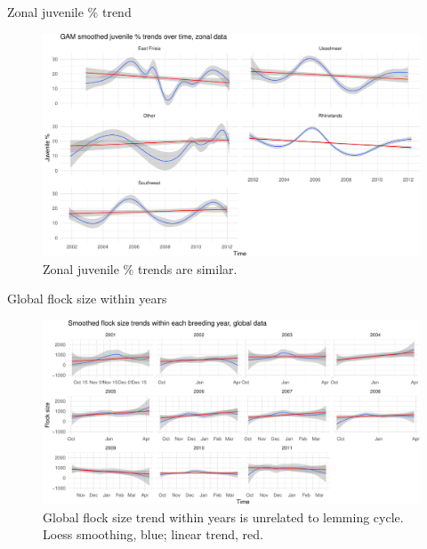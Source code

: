 \documentclass[10pt,ignorenonframetext,]{beamer}
\begin{document}
\begin{frame}{Zonal juvenile \% trend}

\begin{figure}[htbp]
\centering
\includegraphics{goose_code008pres_files/figure-beamer/trend_juv_zonal-1.pdf}
\caption{Zonal juvenile \% trends are similar.}
\end{figure}

\end{frame}

\begin{frame}{Global flock size within years}

\begin{figure}[htbp]
\centering
\includegraphics{goose_code008pres_files/figure-beamer/trend_flock_yearly-1.pdf}
\caption{Global flock size trend within years is unrelated to lemming
cycle. Loess smoothing, blue; linear trend, red.}
\end{figure}

\end{frame}
\end{document}
